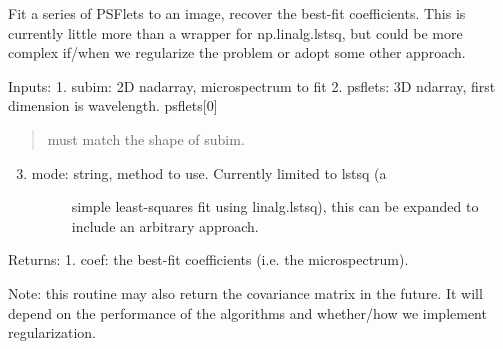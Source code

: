 \documentclass[letterpaper,10pt,english]{sphinxmanual}
\begin{document}
\begin{fulllineitems}
\label{tools:tools.reduction.fit_cutout}
Fit a series of PSFlets to an image, recover the best-fit coefficients.
This is currently little more than a wrapper for np.linalg.lstsq, but 
could be more complex if/when we regularize the problem or adopt some
other approach.

Inputs:
1. subim:   2D nadarray, microspectrum to fit
2. psflets: 3D ndarray, first dimension is wavelength.  psflets{[}0{]}
\begin{quote}

must match the shape of subim.
\end{quote}
\begin{enumerate}
\setcounter{enumi}{2}
\item {} \begin{description}
\item[{mode:    string, method to use.  Currently limited to lstsq (a }] \leavevmode
simple least-squares fit using linalg.lstsq), this can
be expanded to include an arbitrary approach.

\end{description}

\end{enumerate}

Returns:
1. coef:    the best-fit coefficients (i.e. the microspectrum).

Note: this routine may also return the covariance matrix in the future.
It will depend on the performance of the algorithms and whether/how we
implement regularization.

\end{fulllineitems}

\end{document}
